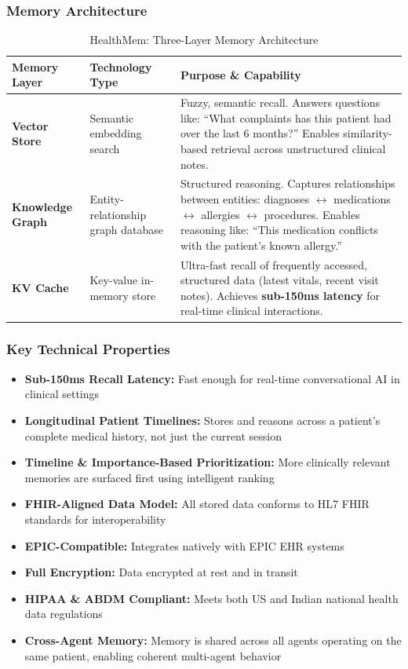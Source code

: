 \documentclass[12pt,a4paper]{article}
\begin{document}
\subsubsection{Memory Architecture}

\begin{table}[H]
\centering
\renewcommand{\arraystretch}{1.4}
\begin{tabularx}{\textwidth}{llX}
\toprule
\textbf{Memory Layer} & \textbf{Technology Type} & \textbf{Purpose \& Capability} \\
\midrule
\textbf{Vector Store} & Semantic embedding search & 
  Fuzzy, semantic recall. Answers questions like: ``What complaints has this patient had over the last 6 months?'' Enables similarity-based retrieval across unstructured clinical notes. \\
\midrule
\textbf{Knowledge Graph} & Entity-relationship graph database & 
  Structured reasoning. Captures relationships between entities: diagnoses $\leftrightarrow$ medications $\leftrightarrow$ allergies $\leftrightarrow$ procedures. Enables reasoning like: ``This medication conflicts with the patient's known allergy.'' \\
\midrule
\textbf{KV Cache} & Key-value in-memory store & 
  Ultra-fast recall of frequently accessed, structured data (latest vitals, recent visit notes). Achieves \textbf{sub-150ms latency} for real-time clinical interactions. \\
\bottomrule
\end{tabularx}
\caption{HealthMem: Three-Layer Memory Architecture}
\end{table}

\subsubsection{Key Technical Properties}

\begin{itemize}[noitemsep]
    \item \textbf{Sub-150ms Recall Latency:} Fast enough for real-time conversational AI in clinical settings
    \item \textbf{Longitudinal Patient Timelines:} Stores and reasons across a patient's complete medical history, not just the current session
    \item \textbf{Timeline \& Importance-Based Prioritization:} More clinically relevant memories are surfaced first using intelligent ranking
    \item \textbf{FHIR-Aligned Data Model:} All stored data conforms to HL7 FHIR standards for interoperability
    \item \textbf{EPIC-Compatible:} Integrates natively with EPIC EHR systems
    \item \textbf{Full Encryption:} Data encrypted at rest and in transit
    \item \textbf{HIPAA \& ABDM Compliant:} Meets both US and Indian national health data regulations
    \item \textbf{Cross-Agent Memory:} Memory is shared across all agents operating on the same patient, enabling coherent multi-agent behavior
\end{itemize}
\end{document}
